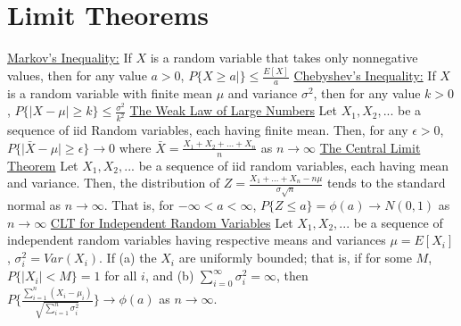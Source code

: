 \documentclass{article}
\begin{document}
	\section{Limit Theorems}
	\underline{Markov's Inequality:} 
	\newline If $X$ is a random variable that takes only nonnegative values, then for any value $a > 0$, $P\{X \geq a|\} \leq \frac{E[X]}{a}$
	\newline
	\underline{Chebyshev's Inequality:}
	\newline If $X$ is a random variable with finite mean $\mu$ and variance $\sigma^2$, then for any value $k > 0$, $P\{\vert X - \mu\vert \geq k\} \leq \frac{\sigma^2}{k^2}$
	\newline
	\underline{The Weak Law of Large Numbers}
	\newline
	Let $X_1, X_2, ...$ be a sequence of iid Random variables, each having finite mean. Then, for any $\epsilon > 0$, $P\{\vert\bar{X} - \mu\vert \geq \epsilon\} \to 0$ where $\bar{X} = \frac{X_1 + X_2 + ... + X_n}{n}$  as $n\to\infty$
	\newline
	\underline{The Central Limit Theorem}
	\newline
	Let $X_1, X_2,...$ be a sequence of iid random variables, each having mean and variance. Then, the distribution of $Z = \frac{X_1 + ... + X_n - n\mu}{\sigma\sqrt{n}}$ tends to the standard normal as $n\to\infty$. That is, for $-\infty < a < \infty$, $P\{Z \leq a\} = \phi(a) \to N(0,1)$ as $n\to\infty$
	\underline{CLT for Independent Random Variables}
	\newline
	Let $X_1, X_2, ...$ be a sequence of independent random variables having respective means and variances $\mu = E[X_i]$, $\sigma_i^2 = Var(X_i)$. If (a) the $X_i$ are uniformly bounded; that is, if for some $M$, $P\{\vert X_i\vert < M\} = 1$ for all $i$, and (b) $\sum_{i = 0}^{\infty}\sigma_i^2 = \infty$, then $P\{\frac{\sum_{i = 1}^n(X_i -\mu_i)}{\sqrt{\sum_{i = 1}^n\sigma_i^2}}\} \to \phi(a)$ as $n \to \infty$.
\end{document}
